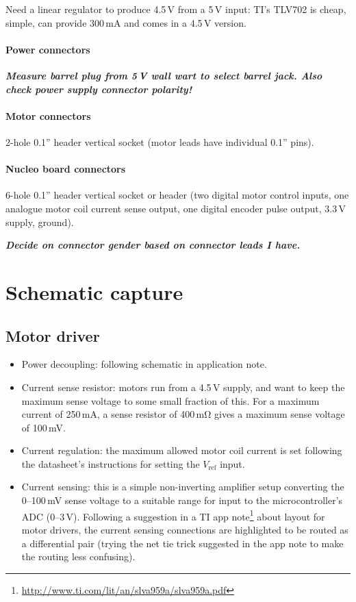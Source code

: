 \documentclass[a4paper,11pt,article]{memoir}
\newcommand{\todo}[1]{{\color{red}\textit{\textbf{#1}}}}
\begin{document}
Need a linear regulator to produce 4.5\,V from a 5\,V input: TI's
TLV702 is cheap, simple, can provide 300\,mA and comes in a 4.5\,V
version.

\paragraph{Power connectors}

\todo{Measure barrel plug from 5\,V wall wart to select barrel jack.
  Also check power supply connector polarity!}

\paragraph{Motor connectors}

2-hole 0.1'' header vertical socket (motor leads have individual 0.1''
pins).

\paragraph{Nucleo board connectors}

6-hole 0.1'' header vertical socket or header (two digital motor
control inputs, one analogue motor coil current sense output, one
digital encoder pulse output, 3.3\,V supply, ground).

\todo{Decide on connector gender based on connector leads I have.}


\section*{Schematic capture}

\subsection*{Motor driver}

\begin{itemize}
  \item{Power decoupling: following schematic in application note.}
  \item{Current sense resistor: motors run from a 4.5\,V supply, and
    want to keep the maximum sense voltage to some small fraction of
    this. For a maximum current of 250\,mA, a sense resistor of
    400\,$\mathrm{m\Omega}$ gives a maximum sense voltage of 100\,mV.}
  \item{Current regulation: the maximum allowed motor coil current is
    set following the datasheet's instructions for setting the
    $V_\mathrm{ref}$ input.}
  \item{Current sensing: this is a simple non-inverting amplifier
    setup converting the 0--100\,mV sense voltage to a suitable range
    for input to the microcontroller's ADC (0--3\,V). Following a
    suggestion in a TI app
    note\footnote{\url{http://www.ti.com/lit/an/slva959a/slva959a.pdf}}
    about layout for motor drivers, the current sensing connections
    are highlighted to be routed as a differential pair (trying the
    net tie trick suggested in the app note to make the routing less
    confusing).}
\end{itemize}
\end{document}
